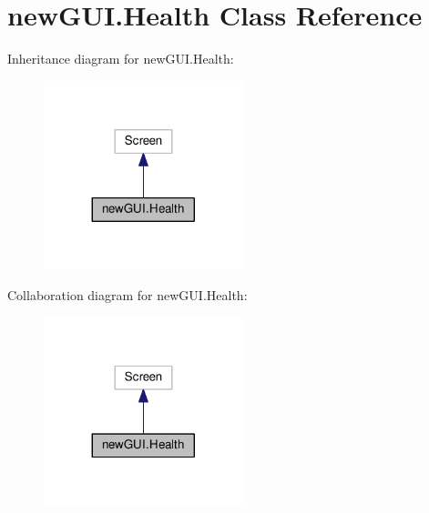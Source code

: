 \hypertarget{classnewGUI_1_1Health}{}\section{new\+G\+U\+I.\+Health Class Reference}
\label{classnewGUI_1_1Health}


Inheritance diagram for new\+G\+U\+I.\+Health\+:\nopagebreak
\begin{figure}[H]
\begin{center}
\leavevmode
\includegraphics[width=164pt]{classnewGUI_1_1Health__inherit__graph}
\end{center}
\end{figure}


Collaboration diagram for new\+G\+U\+I.\+Health\+:\nopagebreak
\begin{figure}[H]
\begin{center}
\leavevmode
\includegraphics[width=164pt]{classnewGUI_1_1Health__coll__graph}
\end{center}
\end{figure}
